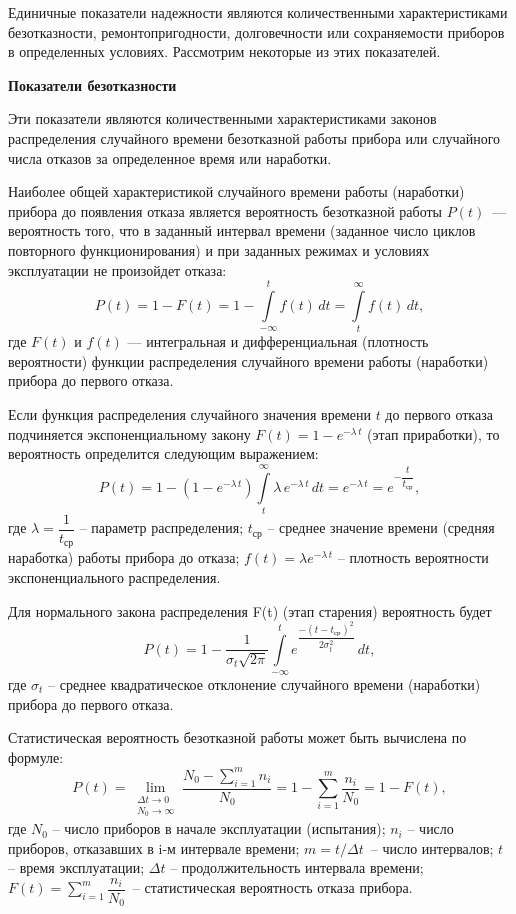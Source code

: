 Единичные показатели надежности являются количественными характеристиками безотказности, ремонтопригодности, долговечности или сохраняемости приборов в определенных условиях. Рассмотрим некоторые из этих показателей.

\begin{flushleft}
\textbf{Показатели безотказности}
\end{flushleft}

Эти показатели являются количественными характеристиками законов распределения случайного времени безотказной работы прибора или случайного числа отказов за определенное время или наработки.

Наиболее общей характеристикой случайного времени работы (наработки) прибора до появления отказа является вероятность безотказной работы $ P(t) $~--- вероятность того, что в заданный интервал времени (заданное число циклов повторного функционирования) и при заданных режимах и условиях эксплуатации не произойдет отказа:
\[ P(t) = 1 - F(t) = 1 - \int\limits_{-\infty}^{t}f(t)\,dt = \int\limits_{t}^{\infty}f(t)\,dt, \]
где $ F(t) $ и $ f(t) $ --- интегральная и дифференциальная (плотность вероятности) функции распределения случайного времени работы (наработки) прибора до первого отказа.

Если функция распределения случайного значения времени $ t $ до первого отказа подчиняется экспоненциальному закону $ F(t) = 1 - e^{-\lambda\,t} $ (этап приработки), то вероятность определится следующим выражением:
\[ P(t) = 1 - (1-e^{-\lambda\,t})\int\limits_{t}^{\infty}\lambda\,e^{-\lambda\,t}\,dt = e^{-\lambda\,t} = e^{-\dfrac{t}{t_\text{ср}}}, \]
где $ \lambda = \dfrac{1}{t_\text{ср}} $ -- параметр распределения; $ t_\text{ср} $ -- среднее значение времени (средняя наработка) работы прибора до отказа; $ f(t) = \lambda e^{-\lambda\,t} $ -- плотность вероятности экспоненциального распределения.

Для нормального закона распределения F(t) (этап старения) вероятность будет
\[ P(t) = 1 - \dfrac{1}{\sigma_t\sqrt{2\pi}}\int\limits_{-\infty}^{t}e^{\dfrac{-(t-t_\text{ср})^2}{2\sigma_t^2}}\,dt, \]
где $ \sigma_t $ -- среднее квадратическое отклонение случайного времени (наработки) прибора до первого отказа.

Статистическая вероятность безотказной работы может быть вычислена по формуле:
\[ P(t) = \lim\limits_{\substack{\Delta t \rightarrow 0 \\ N_0 \rightarrow\infty}} \dfrac{N_0 - \sum\limits_{i=1}^{m}n_i}{N_0} = 
1 - \sum\limits_{i=1}^{m} \dfrac{n_i}{N_0} = 1 -F(t), \]
где $ N_0 $ -- число приборов в начале эксплуатации (испытания); $ n_i $ -- число приборов, отказавших в i-м интервале времени; $ m = t/\Delta t $~-- число интервалов; $ t $ -- время эксплуатации; $ \Delta t $ -- продолжительность интервала времени; $ F(t) = \sum\limits_{i=1}^{m}\dfrac{n_i}{N_0} $~-- статистическая вероятность отказа прибора.

